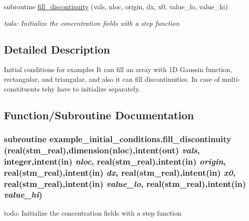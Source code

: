 \begin{CompactItemize}
subroutine \hyperlink{a00059_71681924677036456a1044d44569c143}{fill\_\-discontinuity} (vals, nloc, origin, dx, x0, value\_\-lo, value\_\-hi)
\begin{CompactList}\small\item\em todo: Initialize the concentration fields with a step function \item\end{CompactList}\end{CompactItemize}


\subsection{Detailed Description}
Initial conditions for examples It can fill an array with 1D Gaussin function, rectangular, and triangular, and also it can fill discontinuities. In case of multi-constituents tehy have to initialize separately. 



\subsection{Function/Subroutine Documentation}
\hypertarget{a00059_71681924677036456a1044d44569c143}{
\subsubsection[{fill\_\-discontinuity}]{\setlength{\rightskip}{0pt plus 5cm}subroutine example\_\-initial\_\-conditions.fill\_\-discontinuity (real(stm\_\-real),dimension(nloc),intent(out) {\em vals}, \/  integer,intent(in) {\em nloc}, \/  real(stm\_\-real),intent(in) {\em origin}, \/  real(stm\_\-real),intent(in) {\em dx}, \/  real(stm\_\-real),intent(in) {\em x0}, \/  real(stm\_\-real),intent(in) {\em value\_\-lo}, \/  real(stm\_\-real),intent(in) {\em value\_\-hi})}}
\label{a00059_71681924677036456a1044d44569c143}


todo: Initialize the concentration fields with a step function 

